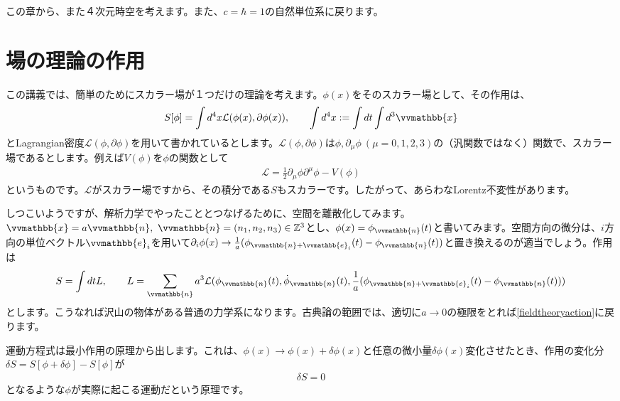\documentclass[report,paper=a4, fontsize=12pt, line_length=16cm, number_of_lines=33,dvipdfmx]{jlreq}
\numberwithin{equation}{chapter}
\newcommand{\del}{\partial}
\newcommand{\Zb}{\mathbb{Z}}
\newcommand{\xb}{\vvmathbb{x}}
\newcommand{\nb}{\vvmathbb{n}}
\newcommand{\eb}{\vvmathbb{e}}
\newcommand{\Lcal}{\mathcal{L}}
\begin{document}
この章から、また４次元時空を考えます。また、$c=\hbar=1$の自然単位系に戻ります。


\section{場の理論の作用}
この講義では、簡単のためにスカラー場が１つだけの理論を考えます。$\phi(x)$をそのスカラー場として、その作用は、
\begin{align}
  S[\phi]=\int d^4x \Lcal(\phi(x),\del\phi(x)),\qquad \int d^4x :=\int dt\int d^3\xb\label{fieldtheoryaction}
\end{align}
とLagrangian密度$\Lcal(\phi,\del\phi)$を用いて書かれているとします。$\Lcal(\phi,\del\phi)$は$\phi,\del_{\mu}\phi\ (\mu=0,1,2,3)$の（汎関数ではなく）関数で、スカラー場であるとします。例えば$V(\phi)$を$\phi$の関数として
\begin{align}
  \Lcal=\frac12\del_{\mu}\phi \del^{\mu}\phi-V(\phi)
\end{align}
というものです。$\Lcal$がスカラー場ですから、その積分である$S$もスカラーです。したがって、あらわなLorentz不変性があります。

しつこいようですが、解析力学でやったこととつなげるために、空間を離散化してみます。$\xb=a\nb,\ \nb=(n_1,n_2,n_3)\in \Zb^3$とし、$\phi(x)=\phi_{\nb}(t)$と書いてみます。空間方向の微分は、$i$方向の単位ベクトル$\eb_i$を用いて$\del_i\phi(x)\to \frac{1}{a}(\phi_{\nb+\eb_i}(t)-\phi_{\nb}(t))$と置き換えるのが適当でしょう。作用は
\begin{align}
  S=\int dt L,\qquad L=\sum_{\nb}a^3 \Lcal(\phi_{\nb}(t),\dot{\phi}_{\nb}(t), \frac{1}{a}(\phi_{\nb+\eb_i}(t)-\phi_{\nb}(t)))
  \label{discreteaction}
\end{align}
とします。こうなれば沢山の物体がある普通の力学系になります。古典論の範囲では、適切に$a\to 0$の極限をとれば\eqref{fieldtheoryaction}に戻ります。

運動方程式は最小作用の原理から出します。これは、$\phi(x)\to \phi(x)+\delta\phi(x)$と任意の微小量$\delta\phi(x)$変化させたとき、作用の変化分$\delta S=S[\phi+\delta \phi]-S[\phi]$が
\begin{align}
  \delta S=0
\end{align}
となるような$\phi$が実際に起こる運動だという原理です。
\end{document}
